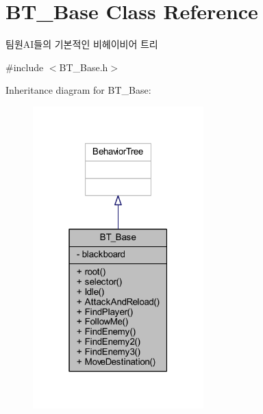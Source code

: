 \hypertarget{class_b_t___base}{}\section{B\+T\+\_\+\+Base Class Reference}
\label{class_b_t___base}


팀원\+A\+I들의 기본적인 비헤이비어 트리  




{\ttfamily \#include $<$B\+T\+\_\+\+Base.\+h$>$}



Inheritance diagram for B\+T\+\_\+\+Base\+:
\nopagebreak
\begin{figure}[H]
\begin{center}
\leavevmode
\includegraphics[width=187pt]{class_b_t___base__inherit__graph}
\end{center}
\end{figure}


